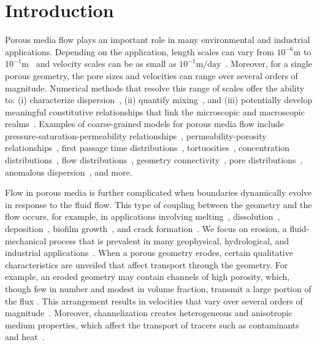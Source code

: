 \documentclass[preprint,10pt]{elsarticle}
\begin{document}
\section{Introduction}
\label{sec:intro}
Porous media flow plays an important role in many environmental and
industrial applications.  Depending on the application, length scales
can vary from $10^{-6}\mathrm{m}$ to
$10^{-1}\mathrm{m}$~\cite{mil-chr-imh-mcb-ped1998} and velocity scales
can be as small as $10^{-1}\mathrm{m/day}$~\cite{kut-scr-dav-ham1995}.
Moreover, for a single porous geometry, the pore sizes and velocities
can range over several orders of magnitude.  Numerical methods that
resolve this range of scales offer the ability to: (i) characterize
dispersion~\cite{saf1959}, (ii) quantify
mixing~\cite{leb-den-dav-bol-car-dec-bou2011, den-leb-eng-bij2011}, and
(iii) potentially develop meaningful constitutive relationships that
link the microscopic and macroscopic
realms~\cite{mil-chr-imh-mcb-ped1998}.  Examples of coarse-grained
models for porous media flow include pressure-saturation-permeability
relationships~\cite{mil-chr-imh-mcb-ped1998}, permeability-porosity
relationships~\cite{dar-mcc1998, car1937, won-kop-tom1984}, first
passage time distributions~\cite{ber-sch-sil2000, hym-den-hag-kan2019,
cve-che-wen1996}, tortuosities~\cite{hak-com-den2019, mat-kha-koz2008,
dud-koz-mat2011, kop-kat-tim1996}, concentration
distributions~\cite{ica-den2019, bel-sal-rin1992}, flow
distributions~\cite{ali-par-wei-bre2017}, geometry
connectivity~\cite{knu-car2005, wes-blo-gra2001}, pore
distributions~\cite{ali-par-wei-bre2017}, anomalous
dispersion~\cite{dea-qua-bir-jua2018, den-cor-sch-ber2004,
sie-ili-pri-riv-gua2019}, and more.  

Flow in porous media is further complicated when boundaries dynamically
evolve in response to the fluid flow. This type of coupling between the
geometry and the flow occurs, for example, in applications involving
melting~\cite{bec-vis1998, rycroft2016asymmetric, jambon2018singular,
favier2019rayleigh, morrow2019moving},
dissolution~\cite{kan-zha-che-he2002, mac2015shape, moo2017,
wykes2018self}, deposition~\cite{joh-eli1995, hewett2018modelling},
biofilm growth~\cite{tan-val-wer2015}, and crack
formation~\cite{cho2019crack}. We focus on erosion, a fluid-mechanical
process that is prevalent in many geophysical, hydrological, and
industrial applications~\cite{berhanu2012shape, hewett2017evolution,
lachaussee2018competitive, lopez2018cfd, allen2019sde, amin2019role}.
When a porous geometry erodes, certain qualitative characteristics are
unveiled that affect transport through the geometry.  For example, an
eroded geometry may contain channels of high porosity, which, though few
in number and modest in volume fraction, transmit a large portion of the
flux \cite{qua-moo2018}. This arrangement results in velocities that vary over several
orders of magnitude~\cite{all-hea-lab-rei2002}.  Moreover,
channelization creates heterogeneous and anisotropic medium properties,
which affect the transport of tracers such as
contaminants~\cite{cve-che-wen1996, dag1987, kon-bre1978} and
heat~\cite{nil-sto1990, ree-sto1995}.
\end{document}
